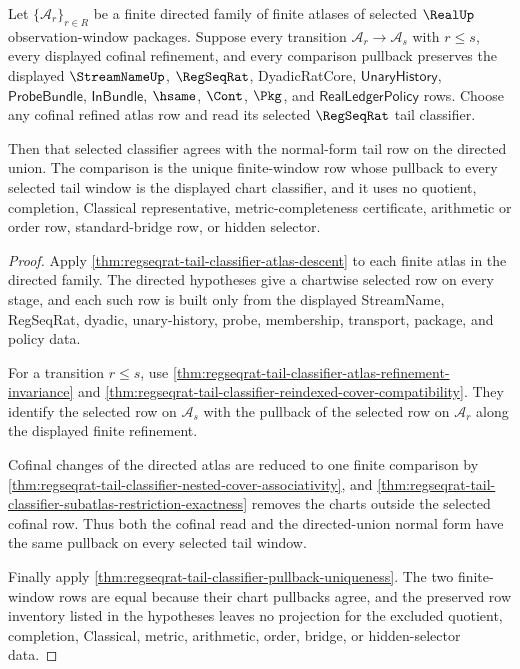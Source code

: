 \begin{theorem}
\label{thm:regseqrat-tail-classifier-directed-refinement-normal-form}
Let $\{\mathcal{A}_r\}_{r\in R}$ be a finite directed family of finite atlases
of selected $\RealUp$ observation-window packages. Suppose every transition
$\mathcal{A}_r\to\mathcal{A}_s$ with $r\leq s$, every displayed cofinal
refinement, and every comparison pullback preserves the displayed
$\StreamNameUp$, $\RegSeqRat$, DyadicRatCore, $\mathsf{UnaryHistory}$,
$\mathsf{ProbeBundle}$, $\mathsf{InBundle}$, $\hsame$, $\Cont$, $\Pkg$, and
$\mathsf{RealLedgerPolicy}$ rows. Choose any cofinal refined atlas row and read
its selected $\RegSeqRat$ tail classifier.

Then that selected classifier agrees with the normal-form tail row on the
directed union. The comparison is the unique finite-window row whose pullback
to every selected tail window is the displayed chart classifier, and it uses no
quotient, completion, Classical representative, metric-completeness
certificate, arithmetic or order row, standard-bridge row, or hidden selector.
\end{theorem}
\begin{proof}
Apply \autoref{thm:regseqrat-tail-classifier-atlas-descent} to each finite atlas
in the directed family. The directed hypotheses give a chartwise selected row
on every stage, and each such row is built only from the displayed
StreamName, RegSeqRat, dyadic, unary-history, probe, membership, transport,
package, and policy data.

For a transition $r\leq s$, use
\autoref{thm:regseqrat-tail-classifier-atlas-refinement-invariance} and
\autoref{thm:regseqrat-tail-classifier-reindexed-cover-compatibility}. They
identify the selected row on $\mathcal{A}_s$ with the pullback of the selected
row on $\mathcal{A}_r$ along the displayed finite refinement.

Cofinal changes of the directed atlas are reduced to one finite comparison by
\autoref{thm:regseqrat-tail-classifier-nested-cover-associativity}, and
\autoref{thm:regseqrat-tail-classifier-subatlas-restriction-exactness} removes
the charts outside the selected cofinal row. Thus both the cofinal read and the
directed-union normal form have the same pullback on every selected tail window.

Finally apply \autoref{thm:regseqrat-tail-classifier-pullback-uniqueness}. The
two finite-window rows are equal because their chart pullbacks agree, and the
preserved row inventory listed in the hypotheses leaves no projection for the
excluded quotient, completion, Classical, metric, arithmetic, order, bridge, or
hidden-selector data.
\end{proof}

